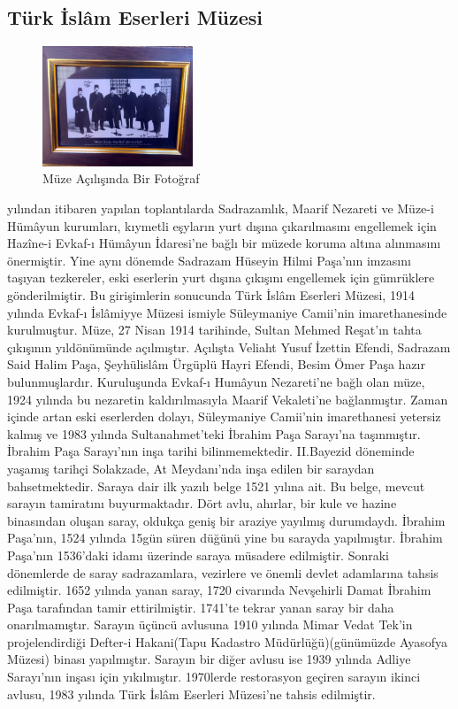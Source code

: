 \subsection{Türk İslâm Eserleri Müzesi}
\begin{figure}
    \includegraphics[width=0.4\textwidth]{assets/museum_opening.jpg}
    \caption{Müze Açılışında Bir Fotoğraf}
    \label{fig:musem_opening}
\end{figure}
\indent{} yılından itibaren yapılan toplantılarda Sadrazamlık, Maarif Nezareti ve Müze-i Hümâyun kurumları, kıymetli eşyların yurt dışına çıkarılmasını engellemek için Hazîne-i Evkaf-ı Hümâyun İdaresi'ne bağlı bir müzede koruma altına alınmasını önermiştir. Yine aynı dönemde Sadrazam Hüseyin Hilmi Paşa'nın imzasını taşıyan tezkereler, eski eserlerin yurt dışına çıkışını engellemek için gümrüklere gönderilmiştir. Bu girişimlerin sonucunda Türk İslâm Eserleri Müzesi, 1914 yılında Evkaf-ı İslâmiyye Müzesi ismiyle Süleymaniye Camii'nin imarethanesinde kurulmuştur. Müze, 27 Nisan 1914 tarihinde, Sultan Mehmed Reşat'ın tahta çıkışının yıldönümünde açılmıştır. Açılışta Veliaht Yusuf İzettin Efendi, Sadrazam Said Halim Paşa, Şeyhülislâm Ürgüplü Hayri Efendi, Besim Ömer Paşa hazır bulunmuşlardır. Kuruluşunda Evkaf-ı Humâyun Nezareti'ne bağlı olan müze, 1924 yılında bu nezaretin kaldırılmasıyla Maarif Vekaleti'ne bağlanmıştır. Zaman içinde artan eski eserlerden dolayı, Süleymaniye Camii'nin imarethanesi yetersiz kalmış ve 1983 yılında Sultanahmet'teki İbrahim Paşa Sarayı'na taşınmıştır.\cite{dia_2}\newline
\indent İbrahim Paşa Sarayı'nın inşa tarihi bilinmemektedir. II.Bayezid döneminde yaşamış tarihçi Solakzade, At Meydanı'nda inşa edilen bir saraydan bahsetmektedir.\cite{atasoy_1} Saraya dair ilk yazılı belge 1521 yılına ait. Bu belge, mevcut sarayın tamiratını buyurmaktadır. Dört avlu, ahırlar, bir kule ve hazine binasından oluşan saray, oldukça geniş bir araziye yayılmış durumdaydı. İbrahim Paşa'nın, 1524 yılında 15gün süren düğünü yine bu sarayda yapılmıştır. İbrahim Paşa'nın 1536'daki idamı üzerinde saraya müsadere edilmiştir. Sonraki dönemlerde de saray sadrazamlara, vezirlere ve önemli devlet adamlarına tahsis edilmiştir. 1652 yılında yanan saray, 1720 civarında Nevşehirli Damat İbrahim Paşa tarafından tamir ettirilmiştir. 1741'te tekrar yanan saray bir daha onarılmamıştır.\cite{dia_3} Sarayın üçüncü avlusuna 1910 yılında Mimar Vedat Tek'in projelendirdiği Defter-i Hakani(Tapu Kadastro Müdürlüğü)(günümüzde Ayasofya Müzesi) binası yapılmıştır. Sarayın bir diğer avlusu ise 1939 yılında Adliye Sarayı'nın inşası için yıkılmıştır. 1970lerde restorasyon geçiren sarayın ikinci avlusu, 1983 yılında Türk İslâm Eserleri Müzesi'ne tahsis edilmiştir.\cite{atasoy_2}